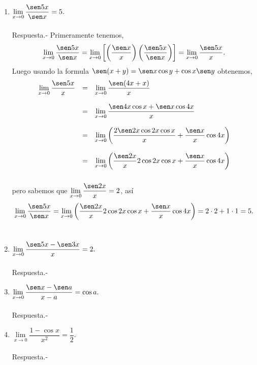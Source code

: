 \begin{enumerate}[\bfseries 1.]
    \item $\lim\limits_{x\to 0}\dfrac{\sen 5x}{\sen x}=5.$\\\\
	Respuesta.-\; Primeramente tenemos,
	$$\lim_{x\to 0}\dfrac{\sen 5x}{\sen x}=\lim_{x\to 0}\left[\left(\dfrac{\sen x}{x}\right)\left(\dfrac{\sen 5x}{\sen x}\right)\right]=\lim_{x\to 0}\dfrac{\sen 5x}{x}.$$
	Luego usando la formula $\sen(x+y)=\sen x \cos y + \cos x \sen y$ obtenemos,
	$$\begin{array}{rcl}
	    \lim\limits_{x\to 0}\dfrac{\sen 5x}{x}&=&\lim\limits_{x\to 0}\dfrac{\sen(4x+x)}{x}\\\\
						  &=&\lim\limits_{x\to 0}\dfrac{\sen 4x \cos x + \sen x \cos 4x}{x}\\\\
						  &=&\lim\limits_{x\to 0}\left(\dfrac{2\sen 2x \cos 2x \cos x}{x}+\dfrac{\sen x}{x}\cos 4x\right)\\\\
						  &=&\lim\limits_{x\to 0}\left(\dfrac{\sen 2x}{x}2\cos 2x \cos x + \dfrac{\sen x}{x}\cos 4x\right)\\\\
	\end{array}$$
	pero sabemos que $\lim\limits_{x\to 0}\dfrac{\sen 2x}{x}=2$, así 
	$$\lim_{x\to 0}\dfrac{\sen 5x}{\sen x}=\lim\limits_{x\to 0}\left(\dfrac{\sen 2x}{x}2\cos 2x \cos x + \dfrac{\sen x}{x}\cos 4x\right)=2\cdot 2 + 1\cdot 1 = 5.$$\\

    \item $\lim\limits_{x\to 0}\dfrac{\sen 5x - \sen 3x}{x}=2.$\\\\
	Respuesta.-\; 

    \item $\lim\limits_{x\to 0}\dfrac{\sen x - \sen a}{x-a}=\cos a.$\\\\
	Respuesta.-\; 

    \item $\lim\limits_{x\to 0}\dfrac{1-\cos x}{x^2}=\dfrac{1}{2}.$\\\\
	Respuesta.-\; 
	



\end{enumerate}


